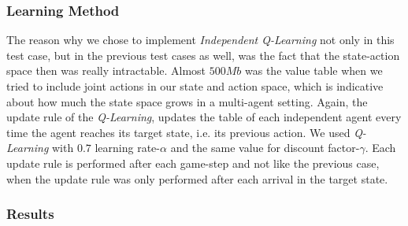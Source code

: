 \documentclass[conference]{IEEEtran}
\begin{document}
\subsubsection{Learning Method}
The reason why we chose to implement \textit{Independent Q-Learning} not only in this test case, but in the previous test cases as well, was the fact that the state-action space then was really intractable. Almost $500Mb$ was the value table when we tried to include joint actions in our state and action space, which is indicative about how much the state space grows in a multi-agent setting.
Again, the update rule of the \textit{Q-Learning}, updates the table of each independent agent every time the agent reaches its target state, i.e. its previous action. We used \textit{Q-Learning} with $0.7$ learning rate-$\alpha$ and the same value for discount factor-$\gamma$. Each update rule is performed after each game-step and not like the previous case, when the update rule was only performed after each arrival in the target state.
\subsubsection{Results}


\subsection{}

\newpage
\printbibliography 

\end{document}
